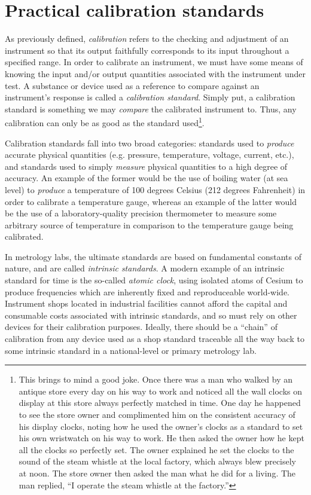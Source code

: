\filbreak
\section{Practical calibration standards}

As previously defined, \textit{calibration} refers to the checking and adjustment of an instrument so that its output faithfully corresponds to its input throughout a specified range.  In order to calibrate an instrument, we must have some means of knowing the input and/or output quantities associated with the instrument under test.  A substance or device used as a reference to compare against an instrument's response is called a \textit{calibration standard}.  Simply put, a calibration standard is something we may \textit{compare} the calibrated instrument to.  Thus, any calibration can only be as good as the standard used\footnote{This brings to mind a good joke.  Once there was a man who walked by an antique store every day on his way to work and noticed all the wall clocks on display at this store always perfectly matched in time.  One day he happened to see the store owner and complimented him on the consistent accuracy of his display clocks, noting how he used the owner's clocks as a standard to set his own wristwatch on his way to work.  He then asked the owner how he kept all the clocks so perfectly set.  The owner explained he set the clocks to the sound of the steam whistle at the local factory, which always blew precisely at noon.  The store owner then asked the man what he did for a living.  The man replied, ``I operate the steam whistle at the factory.''}.

Calibration standards fall into two broad categories: standards used to \textit{produce} accurate physical quantities (e.g. pressure, temperature, voltage, current, etc.), and standards used to simply \textit{measure} physical quantities to a high degree of accuracy.  An example of the former would be the use of boiling water (at sea level) to \textit{produce} a temperature of 100 degrees Celsius (212 degrees Fahrenheit) in order to calibrate a temperature gauge, whereas an example of the latter would be the use of a laboratory-quality precision thermometer to measure some arbitrary source of temperature in comparison to the temperature gauge being calibrated.

\vskip 10pt

In metrology labs, the ultimate standards are based on fundamental constants of nature, and are called \textit{intrinsic standards}.  A modern example of an intrinsic standard for time is the so-called \textit{atomic clock}, using isolated atoms of Cesium to produce frequencies which are inherently fixed and reproduceable world-wide.  Instrument shops located in industrial facilities cannot afford the capital and consumable costs associated with intrinsic standards, and so must rely on other devices for their calibration purposes.  Ideally, there should be a ``chain'' of calibration from any device used as a shop standard traceable all the way back to some intrinsic standard in a national-level or primary metrology lab.    

